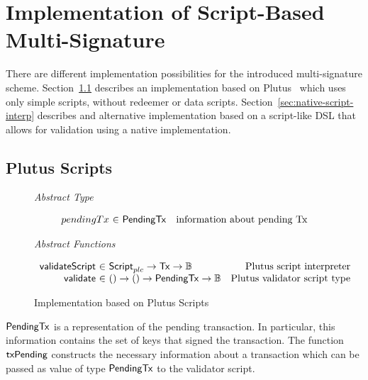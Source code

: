 \documentclass[11pt,a4paper,dvipsnames]{article}
\newcommand{\Bool}{\ensuremath{\mathbb{B}}}
\newcommand{\Tx}{\type{Tx}}
\newcommand{\Script}{\type{Script}}
\newcommand{\ScriptPlutus}{\Script_{plc}}
\newcommand{\PendingTx}{\type{PendingTx}}
\theoremstyle{definition}
\begin{document}
\section{Implementation of Script-Based Multi-Signature}
\label{sec:altern-impl}

There are different implementation possibilities for the introduced
multi-signature scheme. Section~\ref{sec:plutus-scripts} describes an
implementation based on Plutus~\cite{plutus_eutxo} which uses only simple
scripts, without redeemer or data
scripts. Section~\ref{sec:native-script-interp} describes and alternative
implementation based on a script-like DSL that allows for validation using a
native implementation.

\subsection{Plutus Scripts}
\label{sec:plutus-scripts}

\begin{figure*}[hbt]
  \emph{Abstract Type}

  \begin{equation*}
    \begin{array}{r@{~\in~}lr}
      pendingTx & \PendingTx & \text{information about pending Tx}
    \end{array}
  \end{equation*}

  \emph{Abstract Functions}

  \begin{equation*}
    \begin{array}{r@{~\in~}lr}
      \fun{validateScript} & \ScriptPlutus \to \Tx \to \Bool & \text{Plutus script
                                                               interpreter} \\
      \fun{validate} & () \to () \to \PendingTx \to \Bool & \text{Plutus
                                                            validator script type}
    \end{array}
  \end{equation*}
  \caption{Implementation based on Plutus Scripts}
  \label{fig:types_defs_plutus}
\end{figure*}

$\PendingTx$ is a representation of the pending transaction. In particular, this
information contains the set of keys that signed the transaction. The function
$\mathsf{txPending}$ constructs the necessary information about a transaction
which can be passed as value of type $\PendingTx$ to the validator script.
\end{document}
